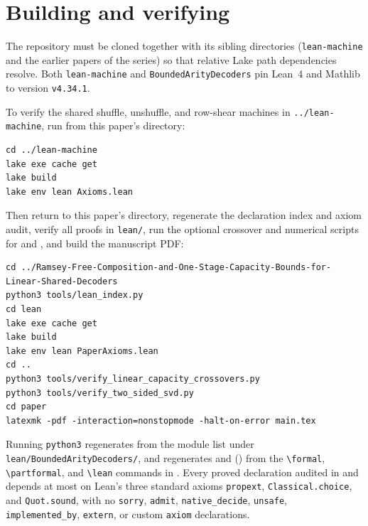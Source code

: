 \section{Building and verifying}\label{sec:verification}

The repository must be cloned together with its sibling directories (\texttt{lean-machine} and the
earlier papers of the series) so that relative Lake path dependencies resolve. Both
\texttt{lean-machine} and \texttt{BoundedArityDecoders} pin Lean~4 and Mathlib to version
\texttt{v4.34.1}.

To verify the shared shuffle, unshuffle, and row-shear machines in \texttt{../lean-machine}, run from
this paper's directory:
\begin{verbatim}
cd ../lean-machine
lake exe cache get
lake build
lake env lean Axioms.lean
\end{verbatim}
Then return to this paper's directory, regenerate the declaration index and axiom audit, verify all
proofs in \texttt{lean/}, run the optional crossover and numerical scripts for
 and , and
build the manuscript PDF:
{\small
\begin{verbatim}
cd ../Ramsey-Free-Composition-and-One-Stage-Capacity-Bounds-for-Linear-Shared-Decoders
python3 tools/lean_index.py
cd lean
lake exe cache get
lake build
lake env lean PaperAxioms.lean
cd ..
python3 tools/verify_linear_capacity_crossovers.py
python3 tools/verify_two_sided_svd.py
cd paper
latexmk -pdf -interaction=nonstopmode -halt-on-error main.tex
\end{verbatim}
}
Running \texttt{python3}  regenerates
 from the module list under
\texttt{lean/BoundedArityDecoders/}, and regenerates  and
 () from the \verb|\formal|,
\verb|\partformal|, and \verb|\lean| commands in . Every proved
declaration audited in  and  depends at most on
Lean's three standard axioms \texttt{propext}, \texttt{Classical.choice}, and \texttt{Quot.sound},
with no \texttt{sorry}, \texttt{admit}, \texttt{native\_decide}, \texttt{unsafe},
\texttt{implemented\_by}, \texttt{extern}, or custom \texttt{axiom} declarations.
